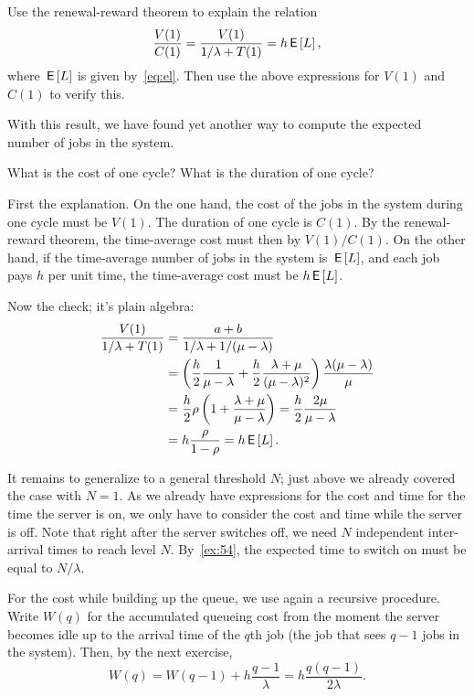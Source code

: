 \begin{exercise}
Use the renewal-reward theorem to explain the  relation
\begin{equation*}
  \frac{V(1)}{C(1)} = \frac{V(1)}{1/\lambda + T(1)} = h \,\mathsf{E}\left[L\right],
\end{equation*}
where $\,\mathsf{E}\left[L\right]$ is given by~\cref{eq:el}. Then use the above expressions for $V(1)$ and $C(1)$ to verify this.

With this result, we have found yet another way to compute the expected number of jobs in the system.  
\begin{hint}
  What is the cost of one cycle? What is the duration of one cycle? 
\end{hint}
\begin{solution}
  First the explanation.
  On the one hand, the cost of the jobs in the system during one cycle must be $V(1)$.
  The duration of one cycle is $C(1)$.
  By the renewal-reward theorem, the time-average cost must then by $V(1)/C(1)$.
  On the other hand, if the time-average number of jobs in the system is $\,\mathsf{E}\left[L\right]$, and each job pays $h$ per unit time, the time-average cost must be $h \,\mathsf{E}\left[L\right]$.

  Now the check; it's plain algebra:
\begin{align*}
  \frac{V(1)}{1/\lambda + T(1)}
  &= \frac{a+b}{1/\lambda + 1/(\mu-\lambda)} \\
  &= \left(\frac h 2 \frac 1 {\mu -\lambda} + \frac h 2 \frac{\lambda + \mu}{(\mu - \lambda)^2}\right)\frac{\lambda(\mu-\lambda)}{\mu}\\
&=\frac{h}2 \rho \left(1 + \frac{\lambda+\mu}{\mu-\lambda}\right) = \frac h 2 \frac{2\mu}{\mu-\lambda}  \\
&= h \frac{\rho}{1-\rho} = h \,\mathsf{E}\left[L\right]. \\
\end{align*}
\end{solution}
\end{exercise}

It remains to generalize to a general threshold $N$; just above we already covered the case with $N=1$.
As we already have expressions for the cost and time for the time the server is on, we only have to consider the cost and time while the server is off.
Note that right after the server switches off, we need $N$ independent inter-arrival times to reach level $N$.
By~\cref{ex:54}, the expected time  to switch on must be equal to $N/\lambda$.

For the cost while building up the queue, we use again a recursive procedure.
Write $W(q)$ for the accumulated queueing cost from the moment the server becomes idle up to the arrival time of the $q$th job (the job that sees $q-1$ jobs in the system).
Then, by the next exercise,
\begin{equation}\label{eq:99}
  W(q) = W(q-1) + h\frac{q-1}{\lambda} = h \frac{q(q-1)}{2\lambda}.
\end{equation}

